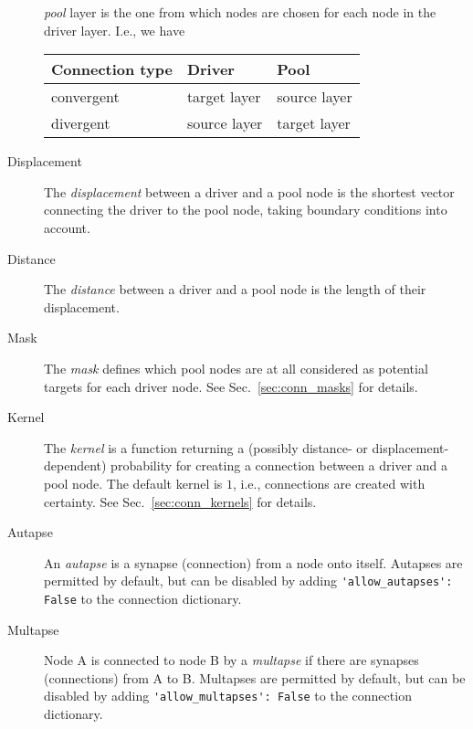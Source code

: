 \documentclass[a4paper,12pt]{report}
\begin{document}
\begin{description}
  \emph{pool} layer is the one from which nodes are chosen for each
  node in the driver layer. I.e., we have\\
  \begin{tabular}{l||l|l}
  Connection type  & Driver & Pool \\\hline\hline
  convergent  & target layer & source layer \\\hline
  divergent   & source layer & target layer
  \end{tabular}
\item[Displacement\index{displacement}] The \emph{displacement}
  between a driver and a pool node is the shortest vector connecting
  the driver to the pool node, taking
  boundary conditions into account.
\item[Distance\index{distance}] The \emph{distance} between a driver
  and a pool node is the length of their displacement.
\item[Mask\index{mask}] The \emph{mask} defines which pool nodes are
  at all considered as potential targets for each driver node. See
  Sec.~\ref{sec:conn_masks} for details.
\item[Kernel\index{kernel}] The \emph{kernel} is a function returning
  a (possibly distance- or displacement-dependent)
  probability for creating a connection between a driver and a pool
  node. The default kernel is $1$, i.e., connections are created with
  certainty. See Sec.~\ref{sec:conn_kernels} for details.
\item[Autapse\index{autapse}] An \emph{autapse} is a synapse (connection) from a
  node onto itself. Autapses are permitted by default, but can be
  disabled by adding \lstinline!'allow_autapses': False! to the
  connection dictionary.
\item[Multapse\index{multapse}] Node A is connected to node B by a
  \emph{multapse} if there are synapses (connections) from A to
  B. Multapses are permitted by default, but can be disabled by adding
  \lstinline!'allow_multapses': False! to the connection dictionary.
\end{description}
\end{document}
